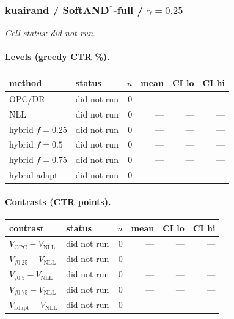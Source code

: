 \documentclass[10pt,a4paper]{article}
\begin{document}
\subsubsection{kuairand / SoftAND$^*$-full / $\gamma=0.25$}
\emph{Cell status: did not run}.
\paragraph{Levels (greedy CTR \%).}
{\centering\small\begin{tabular}{llrrrr}
\toprule method & status & $n$ & mean & CI lo & CI hi \\
\midrule
OPC/DR & did not run & 0 & --- & --- & --- \\
NLL & did not run & 0 & --- & --- & --- \\
hybrid $f{=}0.25$ & did not run & 0 & --- & --- & --- \\
hybrid $f{=}0.5$ & did not run & 0 & --- & --- & --- \\
hybrid $f{=}0.75$ & did not run & 0 & --- & --- & --- \\
hybrid adapt & did not run & 0 & --- & --- & --- \\
\bottomrule\end{tabular}\par}
\paragraph{Contrasts (CTR points).}
{\centering\small\begin{tabular}{llrrrr}
\toprule contrast & status & $n$ & mean & CI lo & CI hi \\
\midrule
$V_{\mathrm{OPC}}-V_{\mathrm{NLL}}$ & did not run & 0 & --- & --- & --- \\
$V_{f0.25}-V_{\mathrm{NLL}}$ & did not run & 0 & --- & --- & --- \\
$V_{f0.5}-V_{\mathrm{NLL}}$ & did not run & 0 & --- & --- & --- \\
$V_{f0.75}-V_{\mathrm{NLL}}$ & did not run & 0 & --- & --- & --- \\
$V_{\mathrm{adapt}}-V_{\mathrm{NLL}}$ & did not run & 0 & --- & --- & --- \\
\bottomrule\end{tabular}\par}
\end{document}
